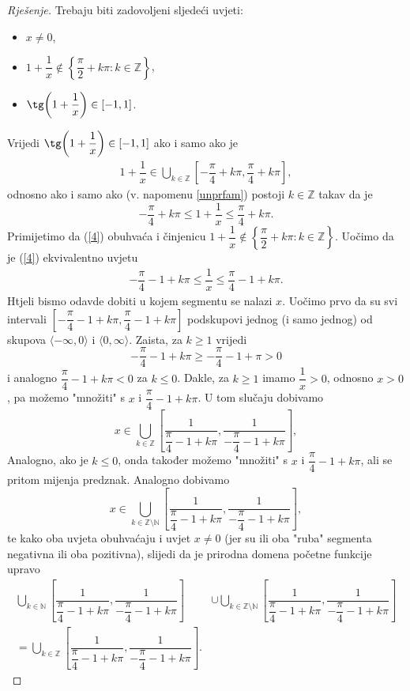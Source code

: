 \begin{proof}[Rješenje]
Trebaju biti zadovoljeni sljedeći uvjeti:
\begin{itemize}
\item $x\neq 0$,
\item $1+\dfrac{1}{x}\notin \left\{\dfrac{\pi}{2}+k\pi : k\in \mathbb{Z}\right\}$,
\item $\tg\left(1+\dfrac{1}{x}\right)\in [-1, 1]$.
\end{itemize}
Vrijedi $\tg\left(1+\dfrac{1}{x}\right)\in [-1, 1]$ ako i samo ako je
\begin{gather}
\label{4}
1+\dfrac{1}{x}\in \bigcup_{k\in \mathbb{Z}}{\left[-\dfrac{\pi}{4}+k\pi, \dfrac{\pi}{4}+k\pi\right]},
\end{gather}
odnosno ako i samo ako (v. napomenu \ref{unprfam}) postoji $k\in \mathbb{Z}$ takav da je
$$-\dfrac{\pi}{4}+k\pi\leq 1+\dfrac{1}{x} \leq \dfrac{\pi}{4}+k\pi.$$
Primijetimo da (\ref{4}) obuhvaća i činjenicu $1+\dfrac{1}{x}\notin \left\{\dfrac{\pi}{2}+k\pi : k\in \mathbb{Z}\right\}$. Uočimo da je (\ref{4}) ekvivalentno uvjetu
\begin{gather}
\label{5}
-\dfrac{\pi}{4}-1+k\pi\leq \dfrac{1}{x} \leq \dfrac{\pi}{4}-1+k\pi.
\end{gather}
Htjeli bismo odavde dobiti u kojem segmentu se nalazi $x$. Uočimo prvo da su svi intervali $\left[-\dfrac{\pi}{4}-1+k\pi, \dfrac{\pi}{4}-1+k\pi\right]$ podskupovi jednog (i samo jednog) od skupova $\langle -\infty, 0\rangle$ i $\langle 0, \infty\rangle$. Zaista, za $k\geq 1$ vrijedi
$$-\dfrac{\pi}{4}-1+k\pi\geq -\dfrac{\pi}{4}-1+\pi>0$$
i analogno $\dfrac{\pi}{4}-1+k\pi<0$ za $k\leq 0$. Dakle, za $k\geq 1$ imamo $\dfrac{1}{x}>0$, odnosno $x>0$, pa možemo "množiti" s $x$ i $\dfrac{\pi}{4}-1+k\pi$. U tom slučaju dobivamo
$$x\in \bigcup_{k\in \mathbb{Z}}{\left[\dfrac{1}{\dfrac{\pi}{4}-1+k\pi}, \dfrac{1}{-\dfrac{\pi}{4}-1+k\pi}\right]},$$
Analogno, ako je $k\leq 0$, onda također možemo "množiti" s  $x$ i $\dfrac{\pi}{4}-1+k\pi$, ali se pritom mijenja predznak. Analogno dobivamo
$$x\in \bigcup_{k\in \mathbb{Z}\setminus{\mathbb{N}}}{\left[\dfrac{1}{\dfrac{\pi}{4}-1+k\pi}, \dfrac{1}{-\dfrac{\pi}{4}-1+k\pi}\right]},$$
te kako oba uvjeta obuhvaćaju i uvjet $x\neq 0$ (jer su ili oba "ruba" segmenta negativna ili oba pozitivna), slijedi da je prirodna domena početne funkcije upravo 
\begin{align*}
\bigcup_{k\in \mathbb{N}}{\left[\dfrac{1}{\dfrac{\pi}{4}-1+k\pi}, \dfrac{1}{-\dfrac{\pi}{4}-1+k\pi}\right]}&\cup \bigcup_{k\in \mathbb{Z}\setminus{\mathbb{N}}}{\left[\dfrac{1}{\dfrac{\pi}{4}-1+k\pi}, \dfrac{1}{-\dfrac{\pi}{4}-1+k\pi}\right]}\\
=\bigcup_{k\in \mathbb{Z}}{\left[\dfrac{1}{\dfrac{\pi}{4}-1+k\pi}, \dfrac{1}{-\dfrac{\pi}{4}-1+k\pi}\right]}.
\end{align*}
\end{proof}
